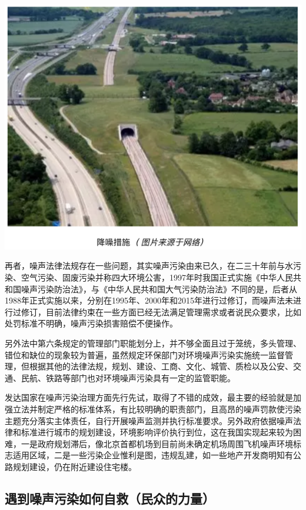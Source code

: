 \documentclass[
]{book}
\begin{document}
\includegraphics[width=8.33in]{images/zaosheng2}

再者，噪声法律法规存在一些问题，其实噪声污染由来已久，在二三十年前与水污染、空气污染、固废污染并称四大环境公害，1997年时我国正式实施《中华人民共和国噪声污染防治法》，与《中华人民共和国大气污染防治法》不同的是，后者从1988年正式实施以来，分别在1995年、2000年和2015年进行过修订，而噪声法未进行过修订，目前法律约束在一些方面已经无法满足管理需求或者说民众要求，比如处罚标准不明确，噪声污染损害赔偿不便操作。

另外法中第六条规定的管理部门职能划分上，并不够全面且过于笼统，多头管理、错位和缺位的现象较为普遍，虽然规定环保部门对环境噪声污染实施统一监督管理，但根据其他的法律法规，规划、建设、工商、文化、城管、质检以及公安、交通、民航、铁路等部门也对环境噪声污染具有一定的监管职能。

发达国家在噪声污染治理方面先行先试，取得了不错的成效，最主要的经验就是加强立法并制定严格的标准体系，有比较明确的职责部门，且高昂的噪声罚款使污染主题充分落实主体责任，自行开展噪声监测并执行标准要求。另外政府依据噪声法律和标准进行城市的规划建设，环境影响评价执行到位，这在我国实现起来较为困难，一是政府规划滞后，像北京首都机场到目前尚未确定机场周围飞机噪声环境标志适用区域，二是一些污染企业惟利是图，违规乱建，如一些地产开发商明知有公路规划建设，仍在附近建设住宅楼。

\hypertarget{ux9047ux5230ux566aux58f0ux6c61ux67d3ux5982ux4f55ux81eaux6551ux6c11ux4f17ux7684ux529bux91cf}{%
\subsection{遇到噪声污染如何自救（民众的力量）}\label{ux9047ux5230ux566aux58f0ux6c61ux67d3ux5982ux4f55ux81eaux6551ux6c11ux4f17ux7684ux529bux91cf}}
\end{document}

